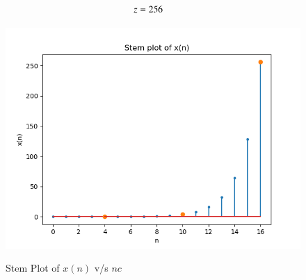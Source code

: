 \documentclass[journal,12pt,twocolumn]{IEEEtran}
\theoremstyle{remark}
\begin{document}
\begin{enumerate}
\begin{align}
																						     \notag z&=256 
																						     \end{align}
																						     \newpage
																						     \begin{figure}[h]
																						         \renewcommand\thefigure{1}
																							     \centering
																							         \caption{Stem Plot of $x(n)$ v/s $nc$}
																								        \includegraphics[width=\columnwidth]{A_1.png}
																									        \label{fig:1}
																										\end{figure}


																										\end{enumerate}																										
\end{document}
